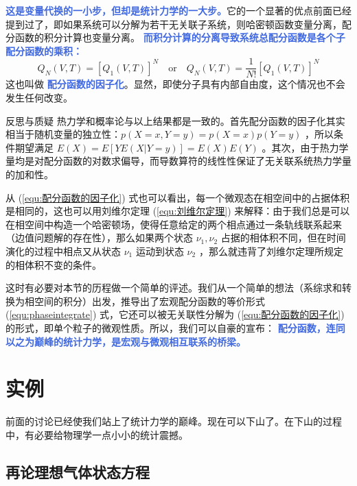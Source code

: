 \textcolor{RoyalBlue}{\textbf{\kaishu 这是变量代换的一小步，但却是统计力学的一大步。}}它的一个显著的优点前面已经提到过了，即如果系统可以分解为若干无关联子系统，则哈密顿函数变量分离，配分函数的积分计算也变量分离。 \textcolor{RoyalBlue}{\textbf{\kaishu  而积分计算的分离导致系统总配分函数是各个子配分函数的乘积：}}
\begin{equation}\label{equ:配分函数的因子化}
    Q_N(V, T)=\left[Q_1(V, T)\right]^N \quad\text{or}\quad Q_N(V, T)=\frac{1}{N !}\left[Q_1(V, T)\right]^N
\end{equation}
这也叫做 \textcolor{RoyalBlue}{\textbf{\kaishu 配分函数的因子化}}。显然，即使分子具有内部自由度，这个情况也不会发生任何改变。

\begin{justification}{\kaishu 反思与质疑}
\kaishu \fontsize{11pt}{16pt}
    \quad\quad 热力学和概率论与以上结果都是一致的。首先配分函数的因子化其实相当于随机变量的独立性：$p(X = x, Y = y) = p(X = x)p(Y = y)$ ，所以条件期望满足 $E(X) = E[YE(X|Y = y)] = E(X)E(Y)$ 。其次，由于热力学量均是对配分函数的对数求偏导，而导数算符的线性性保证了无关联系统热力学量的加和性。

    \quad\quad 从 (\ref*{equ:配分函数的因子化}) 式也可以看出，每一个微观态在相空间中的占据体积是相同的，这也可以用刘维尔定理 (\ref*{equ:刘维尔定理}) 来解释：由于我们总是可以在相空间中构造一个哈密顿场，使得任意给定的两个相点通过一条轨线联系起来（边值问题解的存在性），那么如果两个状态 $\nu_1,\nu_2$ 占据的相体积不同，但在时间演化的过程中相点又从状态 $\nu_1$ 运动到状态 $\nu_2$ ，那么就违背了刘维尔定理所规定的相体积不变的条件。
\end{justification}

这时有必要对本节的历程做一个简单的评述。我们从一个简单的想法（系综求和转换为相空间的积分）出发，推导出了宏观配分函数的等价形式 (\ref*{equ:phaseintegrate}) 式，它还可以被无关联性分解为 (\ref*{equ:配分函数的因子化}) 的形式，即单个粒子的微观性质。所以，我们可以自豪的宣布： \textcolor{RoyalBlue}{\textbf{\kaishu 配分函数，连同以之为巅峰的统计力学，是宏观与微观相互联系的桥梁。}}

\section{实例}

前面的讨论已经使我们站上了统计力学的巅峰。现在可以下山了。在下山的过程中，有必要给物理学一点小小的统计震撼。

\subsection{再论理想气体状态方程}

